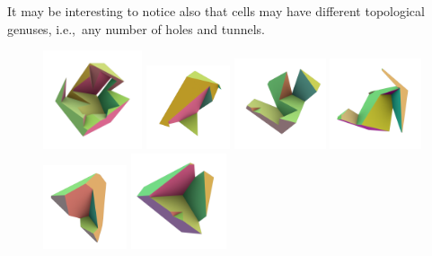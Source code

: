 \documentclass[11pt, oneside]{amsart}   	%
\begin{document}
It may be interesting to notice also that cells may have different topological genuses, i.e.,~any number of holes and tunnels. 
\begin{figure}[htbp] %
   \includegraphics[width=0.26\textwidth]{images/0002.png}\hspace{-9mm}%
   \includegraphics[width=0.22\textwidth]{images/0003.png}\hspace{-7mm}%
   \includegraphics[width=0.24\textwidth]{images/0004.png}\hspace{-7mm}%
   \includegraphics[width=0.24\textwidth]{images/0005.png}\hspace{-7mm}%
   \includegraphics[width=0.22\textwidth]{images/0006.png}%
\vspace{-6mm}   
   \includegraphics[width=0.25\textwidth]{images/0007.png}\hspace{-7mm}%

\end{figure}
\end{document}
